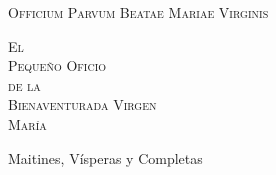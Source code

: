 \documentclass[12pt,a5paper,openright]{memoir}
\begin{document}

\thispagestyle{empty}


\null\vfill
\begin{center}
    \large
    \textsc{Officium Parvum Beatae Mariae Virginis}


    \bigskip
    \bigskip
    \bigskip
    \bigskip
    \bigskip
    \bigskip


    \huge
    \textsc{\gregorian El \\ Pequeño Oficio \\ de la  \\ Bienaventurada Virgen \\ María}

    \bigskip
    \bigskip
    \bigskip
    \bigskip
    \bigskip
    \bigskip


    \normalsize Maitines, Vísperas y Completas


    \footnotesize


\end{center}
\null\vfill


\newpage
\thispagestyle{empty}
\end{document}
